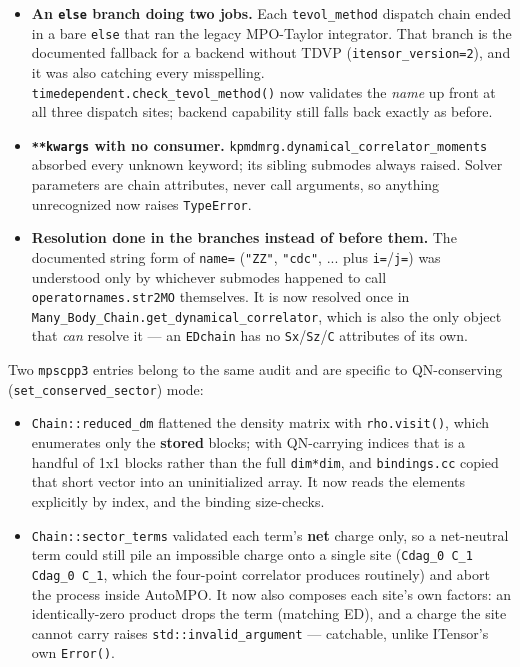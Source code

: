 \documentclass[11pt]{article}
\begin{document}
\begin{itemize}
    EX/maxent are backend-agnostic and pass through, and everything else
    raises. \texttt{edtk/dynamics.py} mirrors it. The
    \texttt{julia\_live} branch had already been fixed this way and is
    what the others now follow.
  \item \textbf{An \texttt{else} branch doing two jobs.} Each
    \texttt{tevol\_method} dispatch chain ended in a bare \texttt{else}
    that ran the legacy MPO-Taylor integrator. That branch is the
    documented fallback for a backend without TDVP
    (\texttt{itensor\_version=2}), and it was also catching every
    misspelling. \texttt{timedependent.check\_tevol\_method()} now
    validates the \emph{name} up front at all three dispatch sites;
    backend capability still falls back exactly as before.
  \item \textbf{\texttt{**kwargs} with no consumer.}
    \texttt{kpmdmrg.dynamical\_correlator\_moments} absorbed every unknown
    keyword; its sibling submodes always raised. Solver parameters are
    chain attributes, never call arguments, so anything unrecognized now
    raises \texttt{TypeError}.
  \item \textbf{Resolution done in the branches instead of before them.}
    The documented string form of \texttt{name=} (\texttt{"ZZ"},
    \texttt{"cdc"}, ... plus \texttt{i=}/\texttt{j=}) was understood only
    by whichever submodes happened to call
    \texttt{operatornames.str2MO} themselves. It is now resolved once in
    \texttt{Many\_Body\_Chain.get\_dynamical\_correlator}, which is also
    the only object that \emph{can} resolve it --- an \texttt{EDchain} has
    no \texttt{Sx}/\texttt{Sz}/\texttt{C} attributes of its own.
\end{itemize}

Two \texttt{mpscpp3} entries belong to the same audit and are specific to
QN-conserving (\texttt{set\_conserved\_sector}) mode:

\begin{itemize}
  \item \texttt{Chain::reduced\_dm} flattened the density matrix with
    \texttt{rho.visit()}, which enumerates only the \textbf{stored}
    blocks; with QN-carrying indices that is a handful of 1x1 blocks
    rather than the full \texttt{dim*dim}, and \texttt{bindings.cc} copied
    that short vector into an uninitialized array. It now reads the
    elements explicitly by index, and the binding size-checks.
  \item \texttt{Chain::sector\_terms} validated each term's \textbf{net}
    charge only, so a net-neutral term could still pile an impossible
    charge onto a single site (\texttt{Cdag\_0 C\_1 Cdag\_0 C\_1}, which
    the four-point correlator produces routinely) and abort the process
    inside AutoMPO. It now also composes each site's own factors: an
    identically-zero product drops the term (matching ED), and a charge
    the site cannot carry raises \texttt{std::invalid\_argument} ---
    catchable, unlike ITensor's own \texttt{Error()}.
\end{itemize}
\end{document}
